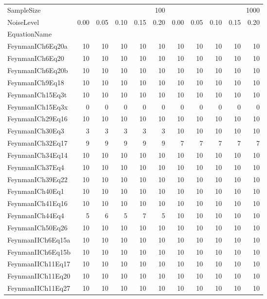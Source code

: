 \begin{tabular}{lrrrrrrrrrr}
\toprule
SampleSize & \multicolumn{5}{r}{100} & \multicolumn{5}{r}{1000} \\
NoiseLevel & 0.00 & 0.05 & 0.10 & 0.15 & 0.20 & 0.00 & 0.05 & 0.10 & 0.15 & 0.20 \\
EquationName &  &  &  &  &  &  &  &  &  &  \\
\midrule
FeynmanICh6Eq20a & 10 & 10 & 10 & 10 & 10 & 10 & 10 & 10 & 10 & 10 \\
FeynmanICh6Eq20 & 10 & 10 & 10 & 10 & 10 & 10 & 10 & 10 & 10 & 10 \\
FeynmanICh6Eq20b & 10 & 10 & 10 & 10 & 10 & 10 & 10 & 10 & 10 & 10 \\
FeynmanICh9Eq18 & 10 & 10 & 10 & 10 & 10 & 10 & 10 & 10 & 10 & 10 \\
FeynmanICh15Eq3t & 10 & 10 & 10 & 10 & 10 & 10 & 10 & 10 & 10 & 10 \\
FeynmanICh15Eq3x & 0 & 0 & 0 & 0 & 0 & 0 & 0 & 0 & 0 & 0 \\
FeynmanICh29Eq16 & 10 & 10 & 10 & 10 & 10 & 10 & 10 & 10 & 10 & 10 \\
FeynmanICh30Eq3 & 3 & 3 & 3 & 3 & 3 & 10 & 10 & 10 & 10 & 10 \\
FeynmanICh32Eq17 & 9 & 9 & 9 & 9 & 9 & 7 & 7 & 7 & 7 & 7 \\
FeynmanICh34Eq14 & 10 & 10 & 10 & 10 & 10 & 10 & 10 & 10 & 10 & 10 \\
FeynmanICh37Eq4 & 10 & 10 & 10 & 10 & 10 & 10 & 10 & 10 & 10 & 10 \\
FeynmanICh39Eq22 & 10 & 10 & 10 & 10 & 10 & 10 & 10 & 10 & 10 & 10 \\
FeynmanICh40Eq1 & 10 & 10 & 10 & 10 & 10 & 10 & 10 & 10 & 10 & 10 \\
FeynmanICh41Eq16 & 10 & 10 & 10 & 10 & 10 & 10 & 10 & 10 & 10 & 10 \\
FeynmanICh44Eq4 & 5 & 6 & 5 & 7 & 5 & 10 & 10 & 10 & 10 & 10 \\
FeynmanICh50Eq26 & 10 & 10 & 10 & 10 & 10 & 10 & 10 & 10 & 10 & 10 \\
FeynmanIICh6Eq15a & 10 & 10 & 10 & 10 & 10 & 10 & 10 & 10 & 10 & 10 \\
FeynmanIICh6Eq15b & 10 & 10 & 10 & 10 & 10 & 10 & 10 & 10 & 10 & 10 \\
FeynmanIICh11Eq17 & 10 & 10 & 10 & 10 & 10 & 10 & 10 & 10 & 10 & 10 \\
FeynmanIICh11Eq20 & 10 & 10 & 10 & 10 & 10 & 10 & 10 & 10 & 10 & 10 \\
FeynmanIICh11Eq27 & 10 & 10 & 10 & 10 & 10 & 10 & 10 & 10 & 10 & 10 \\

\end{tabular}
